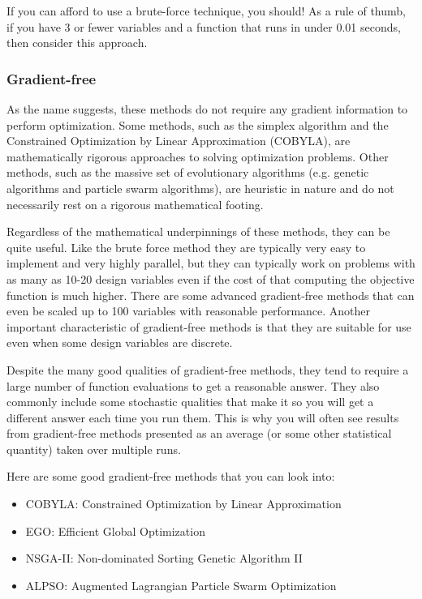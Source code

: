 \documentclass[conf]{new-aiaa}
\begin{document}
            If you can afford to use a brute-force technique, you should! As a rule of thumb, if you have 3 or fewer variables and a function that runs in under 0.01 seconds, then consider this approach. 

        \subsubsection{Gradient-free}
            As the name suggests, these methods do not require any gradient information to perform optimization.
            Some methods, such as the simplex algorithm and the Constrained Optimization by Linear Approximation (COBYLA), are mathematically rigorous approaches to solving optimization problems. 
            Other methods, such as the massive set of evolutionary algorithms (e.g. genetic algorithms and particle swarm algorithms), are heuristic in nature and do not necessarily rest on a rigorous mathematical footing. 

            Regardless of the mathematical underpinnings of these methods, they can be quite useful. 
            Like the brute force method they are typically very easy to implement and very highly parallel, but they can typically work on problems with as many as 10-20 design variables even if the cost of that computing the objective function is much higher. 
            There are some advanced gradient-free methods that can even be scaled up to 100 variables with reasonable performance. 
            Another important characteristic of gradient-free methods is that they are suitable for use even when some design variables are discrete. 

            Despite the many good qualities of gradient-free methods, they tend to require a large number of function evaluations to get a reasonable answer. 
            They also commonly include some stochastic qualities that make it so you will get a different answer each time you run them. 
            This is why you will often see results from gradient-free methods presented as an average (or some other statistical quantity) taken over multiple runs. 

            Here are some good gradient-free methods that you can look into: 
            \begin{itemize}
                \item COBYLA: Constrained Optimization by Linear Approximation
                \item EGO: Efficient Global Optimization 
                \item NSGA-II: Non-dominated Sorting Genetic Algorithm II
                \item ALPSO: Augmented Lagrangian Particle Swarm Optimization
            \end{itemize}%
\end{document}
